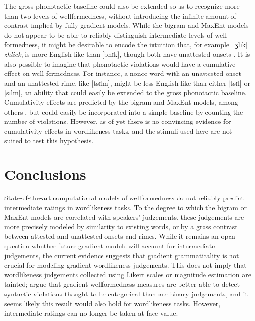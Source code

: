 The gross phonotactic baseline could also be extended so as to recognize more than two levels of wellformedness, without introducing the infinite amount of contrast implied by fully gradient models.
While the bigram and MaxEnt models do not appear to be able to reliably distinguish intermediate levels of well-formedness, it might be desirable to encode the intuition that, for example, [ʒlɪk] \emph{zhlick}, is more English-like than [bnɪk], though both have unattested onsets \citep[e.g.,][50f.]{Clements1983}.
It is also possible to imagine that phonotactic violations would have a cumulative effect on well-formedness. For instance, a nonce word with an unattested onset and an unattested rime, like [tsɪlm], might be less English-like than either [tsɪl] or [sɪlm], an ability that could easily be extended to the gross phonotactic baseline.
Cumulativity effects are predicted by the bigram and MaxEnt models, among others \citep[e.g.,][]{Albright2008,Anttila1997}, but could easily be incorporated into a simple baseline by counting the number of violations.
However, as of yet there is no convincing evidence for cumulativity effects in wordlikeness tasks, and the stimuli used here are not suited to test this hypothesis.

\section{Conclusions}

State-of-the-art computational models of wellformedness do not reliably predict intermediate ratings in wordlikeness tasks.
To the degree to which the bigram or MaxEnt models are correlated with speakers' judgements, these judgements are more precisely modeled by similarity to existing words, or by a gross contrast between attested and unattested onsets and rimes. 
While it remains an open question whether future gradient models will account for intermediate judgements, the current evidence suggests that gradient grammaticality is not crucial for modeling gradient wordlikeness judgements.
This does not imply that wordlikeness judgements collected using Likert scales or magnitude estimation are tainted; \citet{SprouseSubmitted} argue that gradient wellformedness measures are better able to detect syntactic violations thought to be categorical than are binary judgements, and it seems likely this result would also hold for wordlikeness tasks.
However, intermediate ratings can no longer be taken at face value.


